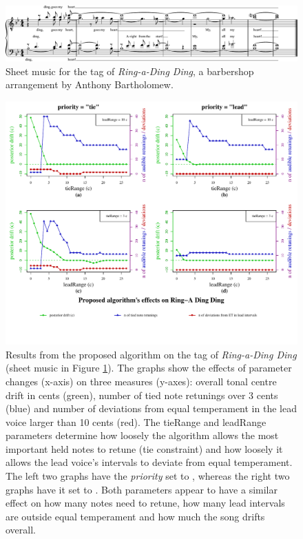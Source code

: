 \documentclass[a4paper]{article}
\begin{document}
\begin{figure}
	\centering
	\includegraphics[width=\linewidth]{Figures/Ding_MuseScore.pdf}
	\caption{Sheet music for the tag of \textit{Ring-a-Ding Ding}, a barbershop arrangement by Anthony Bartholomew.}
	\label{fig:ding_sheets}
\end{figure}

\begin{figure}
	\centering
	\includegraphics[width=\linewidth]{Results/effects_ring.pdf}
	\caption{Results from the proposed algorithm on the tag of \textit{Ring-a-Ding Ding} (sheet music in Figure \ref{fig:ding_sheets}). The graphs show the effects of parameter changes (x-axis) on three measures (y-axes): overall tonal centre drift in cents (green), number of tied note retunings over 3 cents (blue) and number of deviations from equal temperament in the lead voice larger than 10 cents (red). The tieRange and leadRange parameters determine how loosely the algorithm allows the most important held notes to retune (tie constraint) and how loosely it allows the lead voice's intervals to deviate from equal temperament. The left two graphs have the \textit{priority} set to , whereas the right two graphs have it set to . Both parameters appear to have a similar effect on how many notes need to retune, how many lead intervals are outside equal temperament and how much the song drifts overall.}
	\label{fig:results}
\end{figure}
\end{document}
